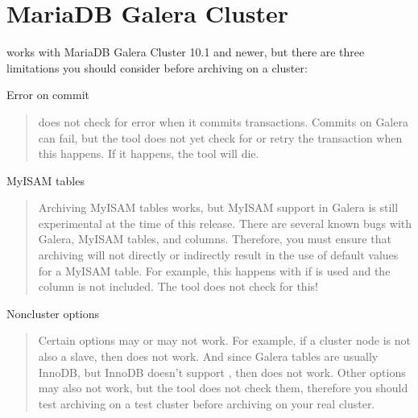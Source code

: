 \documentclass[letterpaper,10pt,english]{sphinxmanual}
\begin{document}
\section{MariaDB Galera Cluster}
\label{\detokenize{mariadb-archiver:mariadb-galera-cluster}}
 works with MariaDB Galera Cluster 10.1 and newer,
but there are three limitations you should consider before archiving on
a cluster:

Error on commit
\begin{quote}

 does not check for error when it commits transactions.
Commits on Galera can fail, but the tool does not yet check for or retry the
transaction when this happens.  If it happens, the tool will die.
\end{quote}

MyISAM tables
\begin{quote}

Archiving MyISAM tables works, but MyISAM support in Galera is still
experimental at the time of this release.  There are several known bugs with
Galera, MyISAM tables, and  columns.  Therefore, you must ensure
that archiving will not directly or indirectly result in the use of default
 values for a MyISAM table.  For example, this happens with
{\hyperref[\detokenize{mariadb-archiver:cmdoption-mariadb-archiver-dest}]{}} if {\hyperref[\detokenize{mariadb-archiver:cmdoption-mariadb-archiver-columns}]{}} is used and the  column is not
included.  The tool does not check for this!
\end{quote}

Non\sphinxhyphen{}cluster options
\begin{quote}

Certain options may or may not work.  For example, if a cluster node
is not also a slave, then {\hyperref[\detokenize{mariadb-archiver:cmdoption-mariadb-archiver-check-slave-lag}]{}} does not work.  And since Galera
tables are usually InnoDB, but InnoDB doesn’t support , then
{\hyperref[\detokenize{mariadb-archiver:cmdoption-mariadb-archiver-delayed-insert}]{}} does not work.  Other options may also not work, but
the tool does not check them, therefore you should test archiving on a test
cluster before archiving on your real cluster.
\end{quote}
\end{document}
